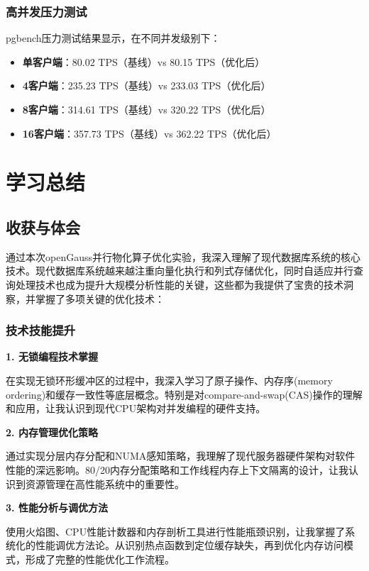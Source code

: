 \subsubsection{高并发压力测试}

pgbench压力测试结果显示，在不同并发级别下：
\begin{itemize}
    \item \textbf{单客户端}：80.02 TPS（基线）vs 80.15 TPS（优化后）
    \item \textbf{4客户端}：235.23 TPS（基线）vs 233.03 TPS（优化后）
    \item \textbf{8客户端}：314.61 TPS（基线）vs 320.22 TPS（优化后）
    \item \textbf{16客户端}：357.73 TPS（基线）vs 362.22 TPS（优化后）
\end{itemize}

\section{学习总结}

\subsection{收获与体会}

通过本次openGauss并行物化算子优化实验，我深入理解了现代数据库系统的核心技术\cite{li2024opengauss}\cite{database2022concurrency}。现代数据库系统越来越注重向量化执行和列式存储优化\cite{zhang2023vectorized}，同时自适应并行查询处理技术\cite{chen2022adaptive}也成为提升大规模分析性能的关键，这些都为我提供了宝贵的技术洞察，并掌握了多项关键的优化技术：

\subsubsection{技术技能提升}

\textbf{1. 无锁编程技术掌握}

在实现无锁环形缓冲区的过程中，我深入学习了原子操作、内存序(memory ordering)和缓存一致性等底层概念。特别是对compare-and-swap(CAS)操作的理解和应用，让我认识到现代CPU架构对并发编程的硬件支持。

\textbf{2. 内存管理优化策略}

通过实现分层内存分配和NUMA感知策略，我理解了现代服务器硬件架构对软件性能的深远影响。80/20内存分配策略和工作线程内存上下文隔离的设计，让我认识到资源管理在高性能系统中的重要性。

\textbf{3. 性能分析与调优方法}

使用火焰图、CPU性能计数器和内存剖析工具进行性能瓶颈识别，让我掌握了系统化的性能调优方法论。从识别热点函数到定位缓存缺失，再到优化内存访问模式，形成了完整的性能优化工作流程。

